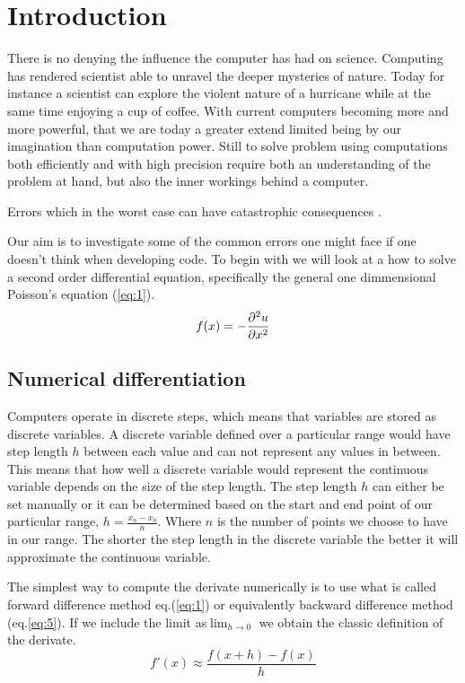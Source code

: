 \section*{Introduction}
There is no denying the influence the computer has had on science. 
Computing has rendered scientist able to unravel the deeper mysteries of nature.
Today for instance a scientist can explore the violent nature of a
hurricane while at the same time enjoying a cup of coffee. With current
computers becoming more and more powerful, that we are today a greater extend
limited being by our imagination than computation power.
Still to solve problem using computations both efficiently and with high
precision require both an understanding of the problem at hand, but also the inner workings behind a computer. 

Errors which in the worst case can have
catastrophic consequences \cite{sleipner_failure}. \par Our aim is to
investigate some of the common errors one might face if one doesn't think when
developing code. To begin with we will look at a how to solve a second order
differential equation, specifically the general one dimmensional Poisson's
equation (\ref{eq:1}).
\begin{equation}\label{eq:2}
  f(x)= - \pd[^2u]{x^2}
\end{equation}

\subsection*{Numerical differentiation}
\par Computers operate in discrete steps, which means that variables are stored
as discrete variables. A discrete variable defined over a particular range would
have step length $h$ between each value and can not represent any values in
between. This means that how well a discrete variable would represent the
continuous variable depends on the size of the step length. The step length $h$
can either be set manually or it can be determined based on the start and end
point of our particular range, $h = \frac{x_n -x_0}{n}$. Where $n$ is the number
of points we choose to have in our range. The shorter the step length in the
discrete variable the better it will approximate the continuous variable.  
\par
The simplest way to compute the derivate numerically is to use what is called
forward difference method eq.(\ref{eq:1}) or equivalently backward difference
method (eq.\ref{eq:5}). If we include the limit as$\lim_{h\to 0}$ we obtain the
classic definition of the derivate. 
\begin{equation}\label{eq:1}
    f'(x) \approx \frac{f(x+h)-f(x)}{h}
\end{equation}

